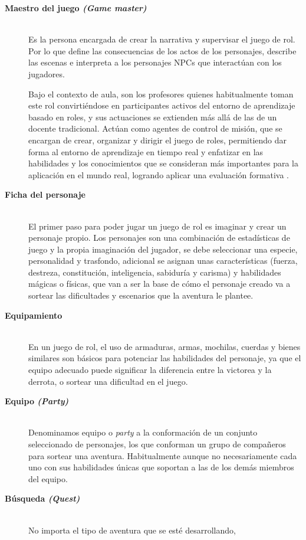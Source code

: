 \begin{description}
\item[\textbf{Maestro del juego \textit{(Game master)}}] \hfill \\ Es la persona encargada de crear la 
narrativa y supervisar el juego de rol. Por lo que define las consecuencias de los actos de los personajes, 
describe las escenas e interpreta a los personajes NPCs que interactúan con los jugadores.

Bajo el contexto de aula, son los profesores quienes habitualmente toman este rol convirtiéndose en 
participantes activos del entorno de aprendizaje basado en roles, y sus actuaciones se extienden más allá de 
las de un docente tradicional. Actúan como agentes de control de misión, que se encargan de crear, organizar y 
dirigir el juego de roles, permitiendo dar forma al entorno de aprendizaje en tiempo real y enfatizar en las 
habilidades y los conocimientos que se consideran más importantes para la aplicación en el mundo real, 
logrando aplicar una evaluación formativa \cite{Young2015199}. 
\item[\textbf{Ficha del personaje}] \hfill \\ El primer paso para poder jugar un juego de rol es imaginar y 
crear un personaje propio. Los personajes son una combinación de estadísticas de juego y la propia imaginación
del jugador, se debe seleccionar una especie, personalidad y trasfondo, adicional se asignan unas
características (fuerza, destreza, constitución, inteligencia, sabiduría y carisma) y habilidades mágicas o
físicas, que van a ser la base de cómo el personaje creado va a sortear las dificultades y escenarios que la
aventura le plantee.
\item[\textbf{Equipamiento}] \hfill \\ En un juego de rol, el uso de armaduras, armas, mochilas, cuerdas y 
bienes similares son básicos para potenciar las habilidades del personaje, ya que el equipo adecuado puede 
significar la diferencia entre la victorea y la derrota, o sortear una dificultad en el juego.
\item[\textbf{Equipo \textit{(Party)}}] \hfill \\ Denominamos equipo o \textit{party} a la conformación de un
conjunto seleccionado de personajes, los que conforman un grupo de compañeros para sortear una aventura.
Habitualmente aunque no necesariamente cada uno con sus habilidades únicas que soportan a las de los demás
miembros del equipo.
\item[\textbf{Búsqueda \textit{(Quest)}}] \hfill \\ No importa el tipo de aventura que se esté desarrollando,

\end{description}
